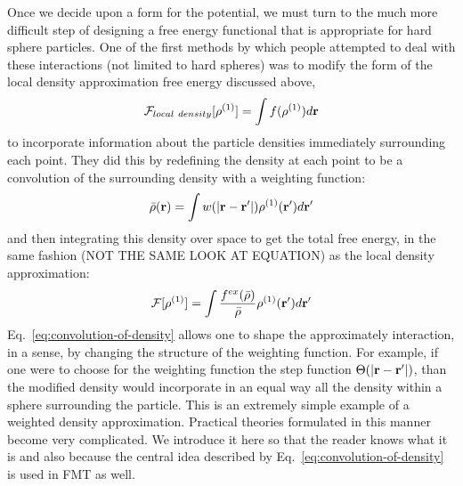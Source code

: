 Once we decide upon a form for the potential, we must turn to the much
more difficult step of designing a free energy functional that is
appropriate for hard sphere particles.  One of the first methods by
which people attempted to deal with these interactions (not limited to
hard spheres) was to modify the form of the local density
approximation free energy discussed above,
\begin{align}
  \mathcal{F}_{local~density}[\rho^{(1)}] = \int f(\rho^{(1)}) d\textbf{r}
\end{align}
to incorporate information about the particle densities immediately
surrounding each point.  They did this by redefining the density at
each point to be a convolution of the surrounding density with a
weighting function:
\begin{align}
  \label{eq:convolution-of-density}
  \bar{\rho}(\textbf{r}) = \int w(|\textbf{r}-\textbf{r}'|) \rho^{(1)}(\textbf{r}') d\textbf{r}'
\end{align}
and then integrating this density over space to get the total free
energy, in the same fashion (NOT THE SAME LOOK AT EQUATION) as the
local density approximation:
\begin{align}
  \mathcal{F}[\rho^{(1)}] = \int \frac{f^{ex}(\bar{\rho})}{\bar{\rho}} \rho^{(1)}(\textbf{r}') d\textbf{r}'
\end{align}
Eq.~\ref{eq:convolution-of-density} allows one to shape the
approximately interaction, in a sense, by changing the structure of
the weighting function.  For example, if one were to choose for the
weighting function the step function $\Theta(|\textbf{r}-\textbf{r}'|)$, than the
modified density would incorporate in an equal way all the density
within a sphere surrounding the particle.  This is an extremely simple
example of a weighted density approximation.  Practical theories
formulated in this manner become very complicated.  We introduce it
here so that the reader knows what it is and also because the central
idea described by Eq.~\ref{eq:convolution-of-density} is used in FMT
as well.

